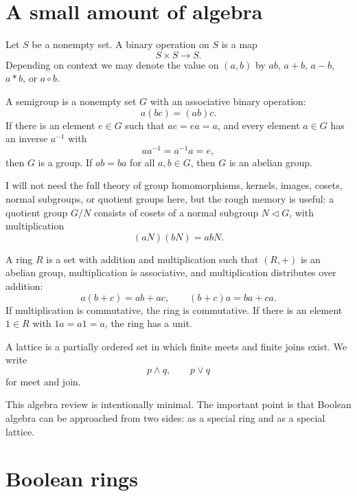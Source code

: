\section{A small amount of algebra}

Let \(S\) be a nonempty set.  A binary operation on \(S\) is a map
\[
  S\times S\to S.
\]
Depending on context we may denote the value on \((a,b)\) by \(ab\), \(a+b\), \(a-b\), \(a*b\), or \(a\circ b\).

\begin{definition}
A semigroup is a nonempty set \(G\) with an associative binary operation:
\[
  a(bc)=(ab)c.
\]
If there is an element \(e\in G\) such that \(ae=ea=a\), and every element \(a\in G\) has an inverse \(a^{-1}\) with
\[
  aa^{-1}=a^{-1}a=e,
\]
then \(G\) is a group.  If \(ab=ba\) for all \(a,b\in G\), then \(G\) is an abelian group.
\end{definition}

I will not need the full theory of group homomorphisms, kernels, images, cosets, normal subgroups, or quotient groups here, but the rough memory is useful: a quotient group \(G/N\) consists of cosets of a normal subgroup \(N\triangleleft G\), with multiplication
\[
  (aN)(bN)=abN.
\]

\begin{definition}
A ring \(R\) is a set with addition and multiplication such that \((R,+)\) is an abelian group, multiplication is associative, and multiplication distributes over addition:
\[
  a(b+c)=ab+ac,
  \qquad
  (b+c)a=ba+ca.
\]
If multiplication is commutative, the ring is commutative.  If there is an element \(1\in R\) with \(1a=a1=a\), the ring has a unit.
\end{definition}

\begin{definition}
A lattice is a partially ordered set in which finite meets and finite joins exist.  We write
\[
  p\wedge q,\qquad p\vee q
\]
for meet and join.
\end{definition}

\begin{remark}
This algebra review is intentionally minimal.  The important point is that Boolean algebra can be approached from two sides: as a special ring and as a special lattice.
\end{remark}

\section{Boolean rings}

